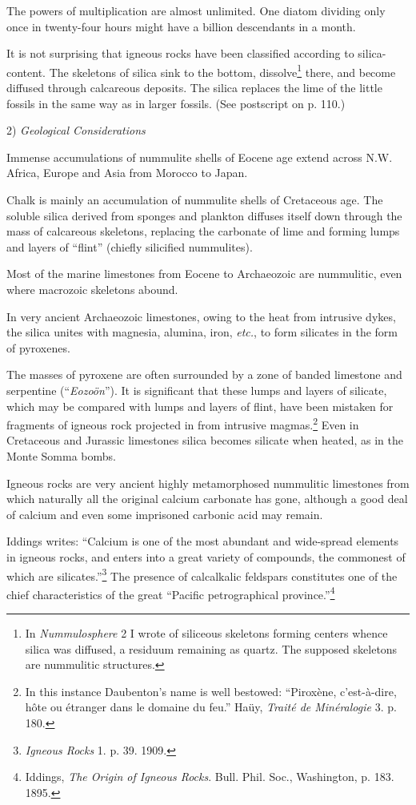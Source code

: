 \documentclass[a4paper, 12pt, oneside]{article}
\begin{document}
The powers of multiplication are almost unlimited. One diatom dividing only once in twenty-four hours might have a billion descendants in a month.

It is not surprising that igneous rocks have been classified according to silica-content. The skeletons of silica sink to the bottom, dissolve\footnote{In \emph{Nummulosphere} 2 I wrote of siliceous skeletons forming centers whence silica was diffused, a residuum remaining as quartz. The supposed skeletons are nummulitic structures.} there, and become diffused through calcareous deposits. The silica replaces the lime of the little fossils in the same way as in larger fossils. (See postscript on p. 110.)

2) \emph{Geological Considerations}

Immense accumulations of nummulite shells of Eocene age extend across N.W. Africa, Europe and Asia from Morocco to Japan.

Chalk is mainly an accumulation of nummulite shells of Cretaceous age. The soluble silica derived from sponges and plankton diffuses itself down through the mass of calcareous skeletons, replacing the carbonate of lime and forming lumps and layers of ``flint'' (chiefly silicified nummulites).

Most of the marine limestones from Eocene to Archaeozoic are nummulitic, even where macrozoic skeletons abound.

In very ancient Archaeozoic limestones, owing to the heat from intrusive dykes, the silica unites with magnesia, alumina, iron, \emph{etc.}, to form silicates in the form of pyroxenes.

The masses of pyroxene are often surrounded by a zone of banded limestone and serpentine (``\emph{Eozoön}''). It is significant that these lumps and layers of silicate, which may be compared with lumps and layers of flint, have been mistaken for fragments of igneous rock projected in from intrusive magmas.\footnote{In this instance Daubenton's name is well bestowed: ``Piroxène, c'est-à-dire, hôte ou étranger dans le domaine du feu.'' Haüy, \emph{Traité de Minéralogie} 3. p. 180.} Even in Cretaceous and Jurassic limestones silica becomes silicate when heated, as in the Monte Somma bombs.

Igneous rocks are very ancient highly metamorphosed nummulitic limestones from which naturally all the original calcium carbonate has gone, although a good deal of calcium and even some imprisoned carbonic acid may remain.

Iddings writes: ``Calcium is one of the most abundant and wide-spread elements in igneous rocks, and enters into a great variety of compounds, the commonest of which are silicates.''\footnote{\emph{Igneous Rocks} 1. p. 39. 1909.} The presence of calcalkalic feldspars constitutes one of the chief characteristics of the great ``Pacific petrographical province.''\footnote{Iddings, \emph{The Origin of Igneous Rocks}. Bull. Phil. Soc., Washington, p. 183. 1895.}
\end{document}
